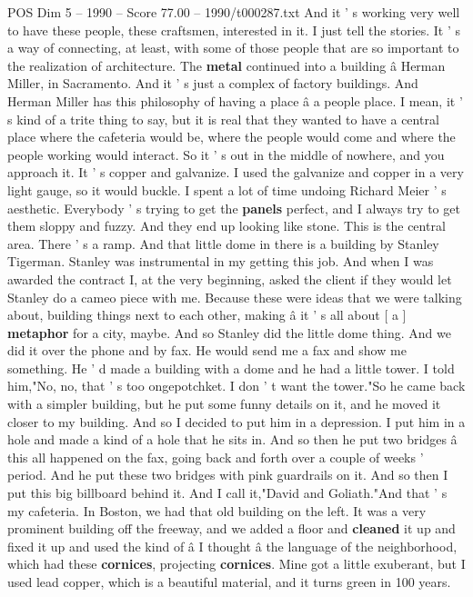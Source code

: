 \begin{textsample}{POS Dim 5 – 1990 – Score 77.00 – 1990/t000287.txt}
And it ' s working very well to have these people, these craftsmen, interested in it.
I just tell the stories.
It ' s a way of connecting, at least, with some of those people that are so important to the realization of architecture.
The \textbf{metal} continued into a building â Herman Miller, in Sacramento.
And it ' s just a complex of factory buildings.
And Herman Miller has this philosophy of having a place â a people place.
I mean, it ' s kind of a trite thing to say, but it is real that they wanted to have a central place where the cafeteria would be, where the people would come and where the people working would interact.
So it ' s out in the middle of nowhere, and you approach it.
It ' s copper and galvanize.
I used the galvanize and copper in a very light gauge, so it would buckle.
I spent a lot of time undoing Richard Meier ' s aesthetic.
Everybody ' s trying to get the \textbf{panels} perfect, and I always try to get them sloppy and fuzzy.
And they end up looking like stone.
This is the central area.
There ' s a ramp.
And that little dome in there is a building by Stanley Tigerman.
Stanley was instrumental in my getting this job.
And when I was awarded the contract I, at the very beginning, asked the client if they would let Stanley do a cameo piece with me.
Because these were ideas that we were talking about, building things next to each other, making â it ' s all about [ a ] \textbf{metaphor} for a city, maybe.
And so Stanley did the little dome thing.
And we did it over the phone and by fax.
He would send me a fax and show me something.
He ' d made a building with a dome and he had a little tower.
I told him,"No, no, that ' s too ongepotchket.
I don ' t want the tower."So he came back with a simpler building, but he put some funny details on it, and he moved it closer to my building.
And so I decided to put him in a depression.
I put him in a hole and made a kind of a hole that he sits in.
And so then he put two bridges â this all happened on the fax, going back and forth over a couple of weeks ' period.
And he put these two bridges with pink guardrails on it.
And so then I put this big billboard behind it.
And I call it,"David and Goliath."And that ' s my cafeteria.
In Boston, we had that old building on the left.
It was a very prominent building off the freeway, and we added a floor and \textbf{cleaned} it up and fixed it up and used the kind of â I thought â the language of the neighborhood, which had these \textbf{cornices}, projecting \textbf{cornices}.
Mine got a little exuberant, but I used lead copper, which is a beautiful material, and it turns green in 100 years.

\end{textsample}
